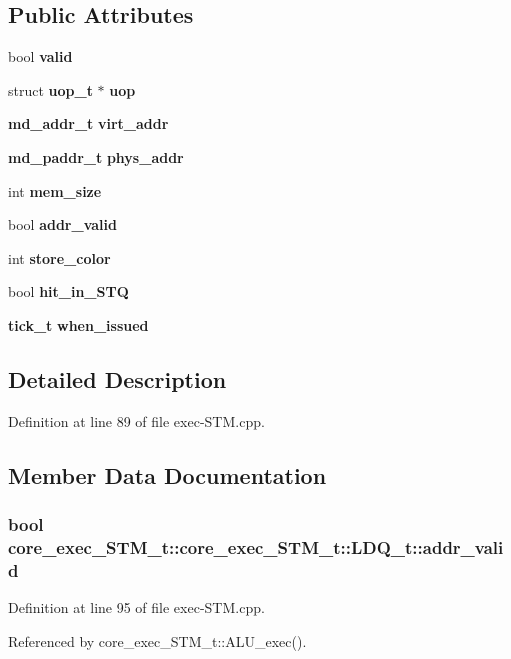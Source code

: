 \subsection*{Public Attributes}
\begin{CompactItemize}
\item 
bool {\bf valid}
\item 
struct {\bf uop\_\-t} $\ast$ {\bf uop}
\item 
{\bf md\_\-addr\_\-t} {\bf virt\_\-addr}
\item 
{\bf md\_\-paddr\_\-t} {\bf phys\_\-addr}
\item 
int {\bf mem\_\-size}
\item 
bool {\bf addr\_\-valid}
\item 
int {\bf store\_\-color}
\item 
bool {\bf hit\_\-in\_\-STQ}
\item 
{\bf tick\_\-t} {\bf when\_\-issued}
\end{CompactItemize}


\subsection{Detailed Description}


Definition at line 89 of file exec-STM.cpp.

\subsection{Member Data Documentation}
\subsubsection[{addr\_\-valid}]{\setlength{\rightskip}{0pt plus 5cm}bool core\_\-exec\_\-STM\_\-t::core\_\-exec\_\-STM\_\-t::LDQ\_\-t::addr\_\-valid}\label{structcore__exec__STM__t_1_1LDQ__t_208764b8d5e6e13c1820d1bbf254a49b}




Definition at line 95 of file exec-STM.cpp.

Referenced by core\_\-exec\_\-STM\_\-t::ALU\_\-exec().
